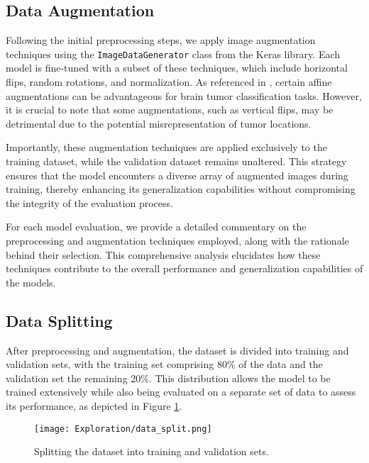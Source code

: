 \subsection{Data Augmentation}\label{data_augmentation}

Following the initial preprocessing steps, we apply image augmentation techniques using the \texttt{ImageDataGenerator} class from the Keras library. Each model is fine-tuned with a subset of these techniques, which include horizontal flips, random rotations, and normalization. As referenced in \cite{nalepa_data_2019}, certain affine augmentations can be advantageous for brain tumor classification tasks. However, it is crucial to note that some augmentations, such as vertical flips, may be detrimental due to the potential misrepresentation of tumor locations.

Importantly, these augmentation techniques are applied exclusively to the training dataset, while the validation dataset remains unaltered. This strategy ensures that the model encounters a diverse array of augmented images during training, thereby enhancing its generalization capabilities without compromising the integrity of the evaluation process.

For each model evaluation, we provide a detailed commentary on the preprocessing and augmentation techniques employed, along with the rationale behind their selection. This comprehensive analysis elucidates how these techniques contribute to the overall performance and generalization capabilities of the models.

\subsection{Data Splitting}\label{data_splitting}
After preprocessing and augmentation, the dataset is divided into training and validation sets, with the training set comprising 80\% of the data and the validation set the remaining 20\%. This distribution allows the model to be trained extensively while also being evaluated on a separate set of data to assess its performance, as depicted in Figure \ref{fig:data_split}.

\begin{figure}[H]
  \begin{center}
    \texttt{[image: Exploration/data\_split.png]}
  \end{center}
  \caption{Splitting the dataset into training and validation sets.}\label{fig:data_split}
\end{figure}


